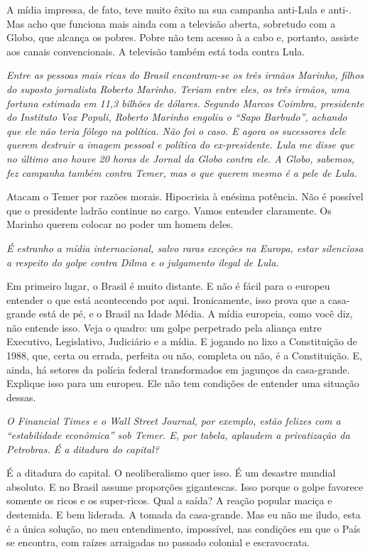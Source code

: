 \normalfont 
A mídia impressa, de fato, teve muito êxito na sua
campanha anti-Lula e anti-. Mas acho que funciona mais ainda com a
televisão aberta, sobretudo com a Globo, que alcança os pobres. Pobre
não tem acesso à  a cabo e, portanto, assiste aos canais
convencionais. A televisão também está toda contra Lula.

\itshape
 Entre as pessoas mais ricas do Brasil encontram-se os
três irmãos Marinho, filhos do suposto jornalista Roberto Marinho.
Teriam entre eles, os três irmãos, uma fortuna estimada em 11,3 bilhões
de dólares. Segundo Marcos Coimbra, presidente do Instituto Vox Populi,
Roberto Marinho engoliu o ``Sapo Barbudo'', achando que ele não teria
fôlego na política. Não foi o caso. E agora os sucessores dele querem
destruir a imagem pessoal e política do ex-presidente. Lula me disse que
no último ano houve 20 horas de Jornal da Globo contra ele. A Globo,
sabemos, fez campanha também contra Temer, mas o que querem mesmo é a
pele de Lula.

\normalfont 
Atacam o Temer por razões morais. Hipocrisia à enésima
potência. Não é possível que o presidente ladrão continue no cargo.
Vamos entender claramente. Os Marinho querem colocar no poder um homem
deles.

\itshape
 É estranho a mídia internacional, salvo raras exceções
na Europa, estar silenciosa a respeito do golpe contra Dilma e o
julgamento ilegal de Lula.

\normalfont 
Em primeiro lugar, o Brasil é muito distante. E não é
fácil para o europeu entender o que está acontecendo por aqui.
Ironicamente, isso prova que a casa-grande está de pé, e o Brasil na
Idade Média. A mídia europeia, como você diz, não entende isso. Veja o
quadro: um golpe perpetrado pela aliança entre Executivo, Legislativo,
Judiciário e a mídia. E jogando no lixo a Constituição de 1988, que,
certa ou errada, perfeita ou não, completa ou não, é a Constituição. E,
ainda, há setores da polícia federal transformados em jagunços da
casa-grande. Explique isso para um europeu. Ele não tem condições de
entender uma situação dessas.

\itshape
 O \emph{Financial Times} e o \emph{Wall Street
Journal}, por exemplo, estão felizes com a ``estabilidade econômica''
sob Temer. E, por tabela, aplaudem a privatização da Petrobras. É a
ditadura do capital?

\normalfont 
É a ditadura do capital. O neoliberalismo quer isso. É um
desastre mundial absoluto. E no Brasil assume proporções gigantescas.
Isso porque o golpe favorece somente os ricos e os super-ricos. Qual a
saída? A reação popular maciça e destemida. E bem liderada. A tomada da
casa-grande. Mas eu não me iludo, esta é a única solução, no meu
entendimento, impossível, nas condições em que o País se encontra, com
raízes arraigadas no passado colonial e escravocrata.

